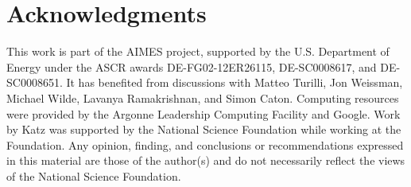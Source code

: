 \documentclass[preprint,12pt]{elsarticle}
\begin{document}
\section*{Acknowledgments}

This work is part of the AIMES project, supported by the U.S. Department of Energy 
under the ASCR awards DE-FG02-12ER26115,
DE-SC0008617, and DE-SC0008651.
It has benefited from discussions with Matteo Turilli, Jon Weissman, Michael Wilde, Lavanya Ramakrishnan, and Simon Caton.
Computing resources were provided by the
Argonne Leadership Computing Facility and Google. Work by Katz was supported by 
the National Science Foundation while working at the Foundation.  Any 
opinion, finding, and conclusions or recommendations expressed in this
 material are those of the author(s) and do not necessarily reflect 
 the views of the National Science Foundation.
 


 






\end{document}
